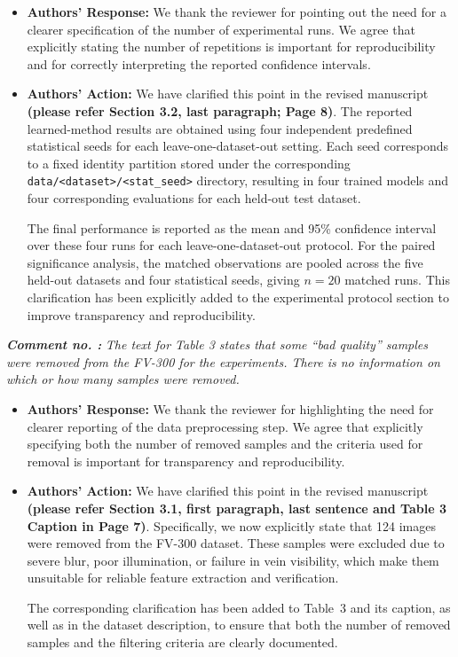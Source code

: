\documentclass[11pt]{article}
\theoremstyle{remark}
\newcounter{mycounter} %
\newcommand\showReviewcounter{\stepcounter{mycounter}\themycounter}
\begin{document}
\begin{itemize}
	\item \textbf{Authors' Response:} 
	We thank the reviewer for pointing out the need for a clearer specification of the number of experimental runs. We agree that explicitly stating the number of repetitions is important for reproducibility and for correctly interpreting the reported confidence intervals.

	\item \textbf{Authors' Action:} 
	We have clarified this point in the revised manuscript \textbf{(please refer Section 3.2, last paragraph; Page 8)}. The reported learned-method results are obtained using four independent predefined statistical seeds for each leave-one-dataset-out setting. Each seed corresponds to a fixed identity partition stored under the corresponding \texttt{data/<dataset>/<stat\_seed>} directory, resulting in four trained models and four corresponding evaluations for each held-out test dataset.

	The final performance is reported as the {mean and 95\% confidence interval over these four runs} for each leave-one-dataset-out protocol. For the paired significance analysis, the matched observations are pooled across the five held-out datasets and four statistical seeds, giving \(n=20\) matched runs. This clarification has been explicitly added to the experimental protocol section to improve transparency and reproducibility.
\end{itemize}
\color{blue} 
\textbf{\textit{Comment no. \showReviewcounter:}} 
\textit{The text for Table 3 states that some “bad quality” samples were removed from the FV-300 for the experiments. There is no information on which or how many samples were removed.}
\color{black}

\begin{itemize}
	\item \textbf{Authors' Response:} 
	We thank the reviewer for highlighting the need for clearer reporting of the data preprocessing step. We agree that explicitly specifying both the number of removed samples and the criteria used for removal is important for transparency and reproducibility.

	\item \textbf{Authors' Action:} 
	We have clarified this point in the revised manuscript \textbf{(please refer Section 3.1, first paragraph, last sentence and Table 3 Caption in  Page 7)}. Specifically, we now explicitly state that {124 images were removed from the FV-300 dataset}. These samples were excluded due to {severe blur, poor illumination, or failure in vein visibility}, which make them unsuitable for reliable feature extraction and verification.

	The corresponding clarification has been added to Table~3 and its caption, as well as in the dataset description, to ensure that both the number of removed samples and the filtering criteria are clearly documented.
\end{itemize}
\end{document}
